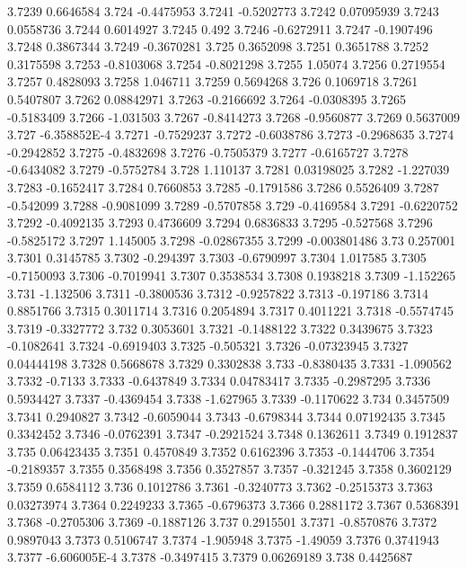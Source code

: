 3.7239  0.6646584
3.724  -0.4475953
3.7241  -0.5202773
3.7242  0.07095939
3.7243  0.0558736
3.7244  0.6014927
3.7245  0.492
3.7246  -0.6272911
3.7247  -0.1907496
3.7248  0.3867344
3.7249  -0.3670281
3.725  0.3652098
3.7251  0.3651788
3.7252  0.3175598
3.7253  -0.8103068
3.7254  -0.8021298
3.7255  1.05074
3.7256  0.2719554
3.7257  0.4828093
3.7258  1.046711
3.7259  0.5694268
3.726  0.1069718
3.7261  0.5407807
3.7262  0.08842971
3.7263  -0.2166692
3.7264  -0.0308395
3.7265  -0.5183409
3.7266  -1.031503
3.7267  -0.8414273
3.7268  -0.9560877
3.7269  0.5637009
3.727  -6.358852E-4
3.7271  -0.7529237
3.7272  -0.6038786
3.7273  -0.2968635
3.7274  -0.2942852
3.7275  -0.4832698
3.7276  -0.7505379
3.7277  -0.6165727
3.7278  -0.6434082
3.7279  -0.5752784
3.728  1.110137
3.7281  0.03198025
3.7282  -1.227039
3.7283  -0.1652417
3.7284  0.7660853
3.7285  -0.1791586
3.7286  0.5526409
3.7287  -0.542099
3.7288  -0.9081099
3.7289  -0.5707858
3.729  -0.4169584
3.7291  -0.6220752
3.7292  -0.4092135
3.7293  0.4736609
3.7294  0.6836833
3.7295  -0.527568
3.7296  -0.5825172
3.7297  1.145005
3.7298  -0.02867355
3.7299  -0.003801486
3.73  0.257001
3.7301  0.3145785
3.7302  -0.294397
3.7303  -0.6790997
3.7304  1.017585
3.7305  -0.7150093
3.7306  -0.7019941
3.7307  0.3538534
3.7308  0.1938218
3.7309  -1.152265
3.731  -1.132506
3.7311  -0.3800536
3.7312  -0.9257822
3.7313  -0.197186
3.7314  0.8851766
3.7315  0.3011714
3.7316  0.2054894
3.7317  0.4011221
3.7318  -0.5574745
3.7319  -0.3327772
3.732  0.3053601
3.7321  -0.1488122
3.7322  0.3439675
3.7323  -0.1082641
3.7324  -0.6919403
3.7325  -0.505321
3.7326  -0.07323945
3.7327  0.04444198
3.7328  0.5668678
3.7329  0.3302838
3.733  -0.8380435
3.7331  -1.090562
3.7332  -0.7133
3.7333  -0.6437849
3.7334  0.04783417
3.7335  -0.2987295
3.7336  0.5934427
3.7337  -0.4369454
3.7338  -1.627965
3.7339  -0.1170622
3.734  0.3457509
3.7341  0.2940827
3.7342  -0.6059044
3.7343  -0.6798344
3.7344  0.07192435
3.7345  0.3342452
3.7346  -0.0762391
3.7347  -0.2921524
3.7348  0.1362611
3.7349  0.1912837
3.735  0.06423435
3.7351  0.4570849
3.7352  0.6162396
3.7353  -0.1444706
3.7354  -0.2189357
3.7355  0.3568498
3.7356  0.3527857
3.7357  -0.321245
3.7358  0.3602129
3.7359  0.6584112
3.736  0.1012786
3.7361  -0.3240773
3.7362  -0.2515373
3.7363  0.03273974
3.7364  0.2249233
3.7365  -0.6796373
3.7366  0.2881172
3.7367  0.5368391
3.7368  -0.2705306
3.7369  -0.1887126
3.737  0.2915501
3.7371  -0.8570876
3.7372  0.9897043
3.7373  0.5106747
3.7374  -1.905948
3.7375  -1.49059
3.7376  0.3741943
3.7377  -6.606005E-4
3.7378  -0.3497415
3.7379  0.06269189
3.738  0.4425687
